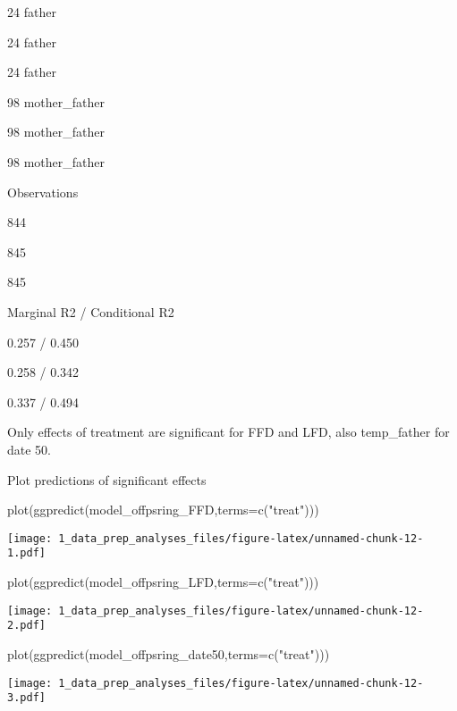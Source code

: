 \documentclass[
]{article}
\newenvironment{Shaded}{\begin{snugshade}}{\end{snugshade}}
\newcommand{\AttributeTok}[1]{\textcolor[rgb]{0.77,0.63,0.00}{#1}}
\newcommand{\FunctionTok}[1]{\textcolor[rgb]{0.00,0.00,0.00}{#1}}
\newcommand{\NormalTok}[1]{#1}
\newcommand{\StringTok}[1]{\textcolor[rgb]{0.31,0.60,0.02}{#1}}
\begin{document}
24 father

24 father

24 father

98 mother\_father

98 mother\_father

98 mother\_father

Observations

844

845

845

Marginal R2 / Conditional R2

0.257 / 0.450

0.258 / 0.342

0.337 / 0.494

Only effects of treatment are significant for FFD and LFD, also
temp\_father for date 50.

Plot predictions of significant effects

\begin{Shaded}
\begin{Highlighting}[]
\FunctionTok{plot}\NormalTok{(}\FunctionTok{ggpredict}\NormalTok{(model\_offpsring\_FFD,}\AttributeTok{terms=}\FunctionTok{c}\NormalTok{(}\StringTok{"treat"}\NormalTok{)))}
\end{Highlighting}
\end{Shaded}

\texttt{[image: 1\_data\_prep\_analyses\_files/figure-latex/unnamed-chunk-12-1.pdf]}

\begin{Shaded}
\begin{Highlighting}[]
\FunctionTok{plot}\NormalTok{(}\FunctionTok{ggpredict}\NormalTok{(model\_offpsring\_LFD,}\AttributeTok{terms=}\FunctionTok{c}\NormalTok{(}\StringTok{"treat"}\NormalTok{)))}
\end{Highlighting}
\end{Shaded}

\texttt{[image: 1\_data\_prep\_analyses\_files/figure-latex/unnamed-chunk-12-2.pdf]}

\begin{Shaded}
\begin{Highlighting}[]
\FunctionTok{plot}\NormalTok{(}\FunctionTok{ggpredict}\NormalTok{(model\_offpsring\_date50,}\AttributeTok{terms=}\FunctionTok{c}\NormalTok{(}\StringTok{"treat"}\NormalTok{)))}
\end{Highlighting}
\end{Shaded}

\texttt{[image: 1\_data\_prep\_analyses\_files/figure-latex/unnamed-chunk-12-3.pdf]}
\end{document}
